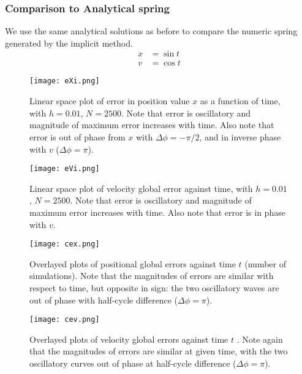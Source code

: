 \documentclass{report}
\begin{document}
\subsubsection*{Comparison to Analytical spring}
We use the same analytical solutions as before to compare the numeric spring generated by the implicit method.
\begin{align*}
x &= \sin t\\
v &= \cos t
\end{align*}
\begin{figure}[H]
	\centering
	\texttt{[image: eXi.png]}
	\label{eXi}
	\caption{Linear space plot of error in position value $x$ as a function of time, with $h=0.01$, $N=2500$. Note that error is oscillatory and magnitude of maximum error increases with time. Also note that error is out of phase from $x$ with $\Delta\phi =- \pi/2$, and in inverse phase with $v$ ($\Delta\phi = \pi$).}
\end{figure}
\begin{figure}[H]
	\centering
	\texttt{[image: eVi.png]}
	\label{eVi}
	\caption{Linear space plot of velocity global error against time, with $h=0.01$, $N=2500$. Note that error is oscillatory and magnitude of maximum error increases with time. Also note that error is in phase with $v$.}
\end{figure}
\begin{figure}[H]
	\centering
	\texttt{[image: cex.png]}
	\label{cex}
	\caption{Overlayed plots of positional global errors against time $t$ (number of simulations). Note that the magnitudes of errors are similar with respect to time, but opposite in sign: the two oscillatory waves are out of phase with half-cycle difference ($\Delta\phi = \pi$).}
\end{figure}
\begin{figure}[H]
	\centering
	\texttt{[image: cev.png]}
	\label{cev}
	\caption{Overlayed plots of velocity global errors against time $t$ . Note again that the magnitudes of errors are similar at given time, with the two oscillatory curves out of phase at half-cycle difference ($\Delta\phi = \pi$).}
\end{figure}
\end{document}
